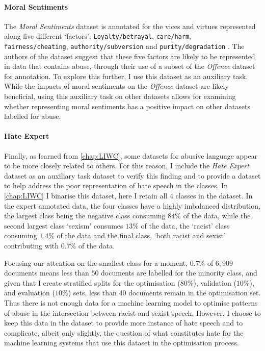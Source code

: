 \paragraph{Moral Sentiments}
The \textit{Moral Sentiments} dataset is annotated for the vices and virtues represented along five different `factors': \texttt{Loyalty/betrayal}, \texttt{care/harm},\\ \texttt{fairness/cheating}, \texttt{authority/subversion} and \texttt{purity/degradation} \citep{Hoover:2019}.
The authors of the dataset suggest that these five factors are likely to be represented in data that contains abuse, through their use of a subset of the \textit{Offence} dataset for annotation.
To explore this further, I use this dataset as an auxiliary task.
While the impacts of moral sentiments on the \textit{Offence} dataset are likely beneficial, using this auxiliary task on other datasets allows for examining whether representing moral sentiments has a positive impact on other datasets labelled for abuse.

\paragraph{Hate Expert}
Finally, as learned from \cref{chap:LIWC}, some datasets for abusive language appear to be more closely related to others.
For this reason, I include the \textit{Hate Expert} dataset as an auxiliary task dataset to verify this finding and to provide a dataset to help address the poor representation of hate speech in the classes.
In \cref{chap:LIWC} I binarise this dataset, here  I retain all $4$ classes in the dataset.
In the expert annotated data, the four classes have a highly imbalanced distribution, the largest class being the negative class consuming $84\%$ of the data, while the second largest class `sexism' consumes $13\%$ of the data, the `racist' class consuming $1.4\%$ of the data and the final class, `both racist and sexist' contributing with $0.7\%$ of the data.

Focusing our attention on the smallest class for a moment, $0.7\%$ of $6,909$ documents means less than $50$ documents are labelled for the minority class, and given that I create stratified splits for the optimisation ($80\%$), validation ($10\%$), and evaluation ($10\%$) sets, less than $40$ documents remain in the optimisation set.
Thus there is not enough data for a machine learning model to optimise patterns of abuse in the intersection between racist and sexist speech.
However, I choose to keep this data in the dataset to provide more instance of hate speech and to complicate, albeit only slightly, the question of what constitutes hate for the machine learning systems that use this dataset in the optimisation process.

